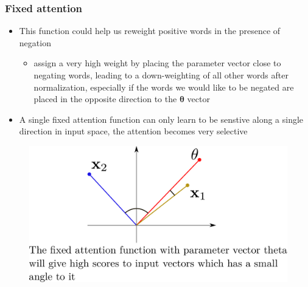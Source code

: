 \documentclass{beamer}
\renewcommand{\vec}[1]{{\boldsymbol{#1}}}
\begin{document}
\begin{frame}
  \frametitle{Fixed attention}
  \begin{itemize}
  \item This function could help us reweight positive words in the presence of negation
    \begin{itemize}
    \item assign a very high weight by placing the parameter vector close to negating words, leading to a down-weighting of all other words after normalization, especially if the words we would like to be negated are placed in the opposite direction to the $\vec{\theta}$ vector
    \end{itemize}
    \item
      A single fixed attention function can only learn to be senstive along a single direction in input space, the attention becomes very selective
  \end{itemize}
\vfill
    \begin{figure}
    \includegraphics[scale=0.3]{fixed_attention}
    \end{figure}

\end{frame}
\end{document}
